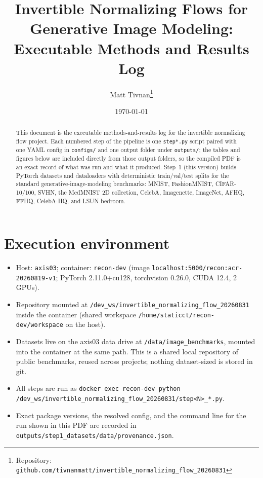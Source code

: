 \documentclass[11pt]{article}
\title{Invertible Normalizing Flows for Generative Image Modeling:\\
Executable Methods and Results Log}
\author{Matt Tivnan\thanks{Repository:
\texttt{github.com/tivnanmatt/invertible\_normalizing\_flow\_20260831}}}
\date{\today}
\begin{document}
\maketitle

\begin{abstract}
This document is the executable methods-and-results log for the invertible
normalizing flow project. Each numbered step of the pipeline is one
\texttt{step*.py} script paired with one YAML config in \texttt{configs/} and
one output folder under \texttt{outputs/}; the tables and figures below are
included directly from those output folders, so the compiled PDF is an exact
record of what was run and what it produced. Step~1 (this version) builds
PyTorch datasets and dataloaders with deterministic train/val/test splits for
the standard generative-image-modeling benchmarks: MNIST, FashionMNIST,
CIFAR-10/100, SVHN, the MedMNIST 2D collection, CelebA, Imagenette, ImageNet,
AFHQ, FFHQ, CelebA-HQ, and LSUN bedroom.
\end{abstract}

\section{Execution environment}
\begin{itemize}
  \item Host: \texttt{axis03}; container: \texttt{recon-dev}
        (image \texttt{localhost:5000/recon:acr-20260819-v1};
        PyTorch 2.11.0+cu128, torchvision 0.26.0, CUDA 12.4, 2 GPUs).
  \item Repository mounted at \texttt{/dev\_ws/invertible\_normalizing\_flow\_20260831}
        inside the container (shared workspace
        \texttt{/home/staticct/recon-dev/workspace} on the host).
  \item Datasets live on the axis03 data drive at
        \texttt{/data/image\_benchmarks}, mounted into the container at the
        same path. This is a shared local repository of public benchmarks,
        reused across projects; nothing dataset-sized is stored in git.
  \item All steps are run as
        \texttt{docker exec recon-dev python /dev\_ws/invertible\_normalizing\_flow\_20260831/step<N>\_*.py}.
  \item Exact package versions, the resolved config, and the command line for
        the run shown in this PDF are recorded in
        \texttt{outputs/step1\_datasets/data/provenance.json}.
\end{itemize}
\end{document}
